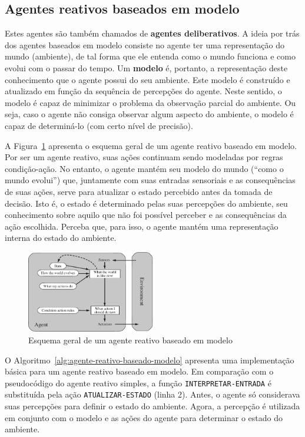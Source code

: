 \subsection{Agentes reativos baseados em modelo}

Estes agentes são também chamados de \textbf{agentes deliberativos}. A ideia por trás dos agentes baseados em modelo consiste no agente ter uma representação do mundo (ambiente), de tal forma que ele entenda como o mundo funciona e como evolui com o passar do tempo. Um \textbf{modelo} é, portanto, a representação deste conhecimento que o agente possui do seu ambiente. Este modelo é construído e atualizado em função da sequência de percepções do agente. Neste sentido, o modelo é capaz de minimizar o problema da observação parcial do ambiente. Ou seja, caso o agente não consiga observar algum aspecto do ambiente, o modelo é capaz de determiná-lo (com certo nível de precisão).

A Figura~\ref{fig:agente-reativo-baseado-modelo} apresenta o esquema geral de um agente reativo baseado em modelo. Por ser um agente reativo, suas ações continuam sendo modeladas por regras condição-ação. No entanto, o agente mantém seu modelo do mundo (``como o mundo evolui'') que, juntamente com suas entradas sensoriais e as consequências de suas ações, serve para atualizar o estado percebido antes da tomada de decisão. Isto é, o estado é determinado pelas suas percepções do ambiente, seu conhecimento sobre aquilo que não foi possível perceber e as consequências da ação escolhida. Perceba que, para isso, o agente mantém uma representação interna do estado do ambiente.

\begin{figure}[h]
	\centering
	\includegraphics[width=0.5\textwidth]{img/agente-reativo-baseado-modelo}
	\caption{Esquema geral de um agente reativo baseado em modelo}
	\label{fig:agente-reativo-baseado-modelo}
\end{figure}

O Algoritmo~\ref{alg:agente-reativo-baseado-modelo} apresenta uma implementação básica para um agente reativo baseado em modelo. Em comparação com o pseudocódigo do agente reativo simples, a função \texttt{INTERPRETAR-ENTRADA} é substituída pela ação \texttt{ATUALIZAR-ESTADO} (linha 2). Antes, o agente só considerava suas percepções para definir o estado do ambiente. Agora, a percepção é utilizada em conjunto com o modelo e as ações do agente para determinar o estado do ambiente.

